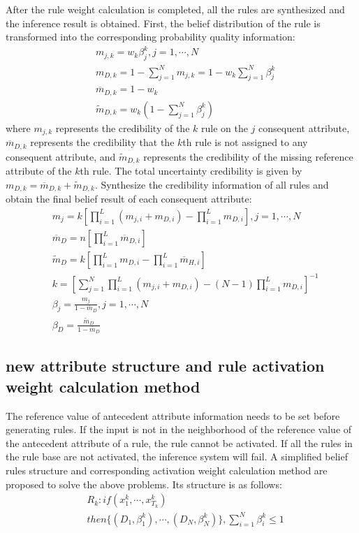 \documentclass{ieeeaccess}
\begin{document}
After the rule weight calculation is completed, all the rules are synthesized and the inference result is obtained.
First, the belief distribution of the rule is transformed into the corresponding probability quality information:
\begin{align}
     & m_{j,k}=w_k\beta_j^k,j=1,\cdots,N                          \\
     & m_{D,k}=1-\sum_{j=1}^Nm_{j,k}=1-w_k\sum_{j=1}^{N}\beta_j^k \\
     & \overline{m}_{D,k}=1-w_k                                   \\
     & \widetilde{m}_{D,k}=w_k(1-\sum_{j=1}^N\beta_j^k)
\end{align}
where $m_{j,k}$ represents the credibility of the $k$ rule on the $j$ consequent attribute,
$\overline{m}_{D,k}$ represents the credibility that the $k$th rule is not assigned to any consequent attribute,
and $\widetilde{m}_{D,k}$  represents the credibility of the missing reference attribute of the $k$th rule.
The total uncertainty credibility is given by $m_{D,k}=\overline{m}_{D,k}+\widetilde{m}_{D,k}$.
Synthesize the credibility information of all rules and obtain the final belief result of each consequent attribute:
\begin{align}
     & m_j=k[\prod_{i=1}^L(m_{j,i}+m_{D,i})-\prod_{i=1}^Lm_{D,i}],j=1,\cdots,N       \\
     & \overline{m}_D=n[\prod_{i=1}^L\overline{m}_{D,i}]                             \\
     & \widetilde{m}_D=k[\prod_{i=1}^Lm_{D,i}-\prod_{i=1}^L\overline{m}_{H,i}]       \\
     & k=[\sum_{j=1}^N\prod_{i=1}^L(m_{j,i}+m_{D,i})-(N-1)\prod_{i=1}^Lm_{D,i}]^{-1} \\
     & \beta_j=\frac{m_j}{1-\overline{m}_D},j=1,\cdots,N                             \\
     & \beta_D=\frac{\widetilde{m}_D}{1-\overline{m}_D}
\end{align}

\subsection{new attribute structure and rule activation weight calculation method}
The reference value of antecedent attribute information needs to be set before generating rules.
If the input is not in the neighborhood of the reference value of the antecedent attribute of a rule, the rule cannot be activated.
If all the rules in the rule base are not activated, the inference system will fail.
A simplified belief rules structure and corresponding activation weight calculation method are proposed to solve the above problems.
Its structure is as follows:
\begin{equation}
    \begin{split}
        &R_k:if(x_1^k , \cdots , x_{T_k}^k)\\
        &then\{(D_1,\beta_1^k),\cdots,(D_N,\beta_N^k)\},\sum_{i=1}^N\beta_i^k\leq1
    \end{split}
\end{equation}
\end{document}
